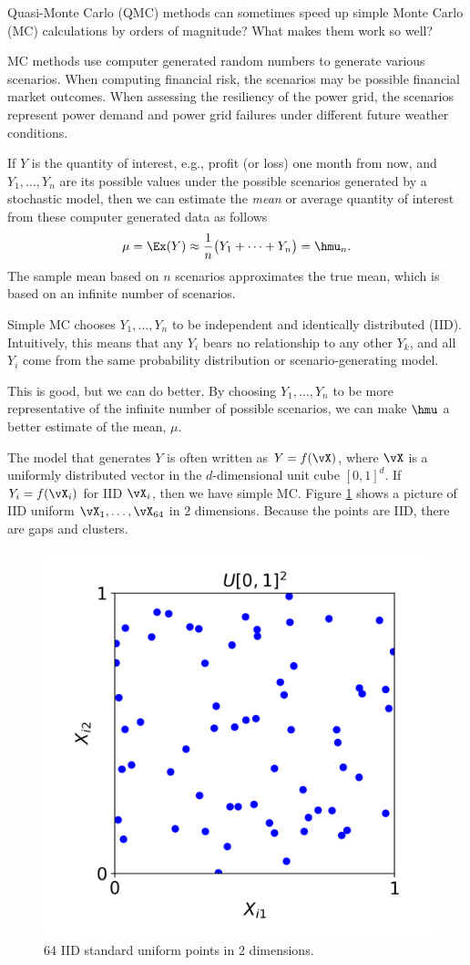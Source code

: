 Quasi-Monte Carlo (QMC) methods can sometimes speed up simple Monte Carlo (MC) calculations by orders of magnitude?  What makes them work so well?

MC methods use computer generated random numbers to generate various scenarios.  When computing financial risk, the scenarios may be possible financial market outcomes.  When assessing the resiliency of the power grid, the scenarios represent power demand and power grid failures under different future weather conditions.

If $Y$ is the quantity of interest, e.g., profit (or loss) one month from now, and $Y_1, \ldots, Y_n$ are its possible values under the possible scenarios generated by a stochastic model, then we can estimate the \emph{mean} or average quantity of interest from these computer generated data as follows
\[
\mu = \Ex(Y) \approx \frac 1n \bigl ( Y_1 + \cdots + Y_n \bigr) = \hmu_n.
\]
The sample mean based on $n$ scenarios approximates the true mean, which is based on an infinite number of scenarios.

Simple MC chooses $Y_1, \ldots, Y_n$ to be independent and identically distributed (IID).  Intuitively, this means that any $Y_i$ bears no relationship to any other $Y_k$, and all $Y_i$ come from the same probability distribution or scenario-generating model.

This is good, but we can do better.  By choosing $Y_1, \ldots, Y_n$ to be more representative of the infinite number of possible scenarios, we can make $\hmu$ a better estimate of the mean, $\mu$.

The model that generates $Y$ is often written as $Y= f(\vX)$, where $\vX$ is a uniformly distributed vector in the $d$-dimensional unit cube $[0,1]^d$.  If $Y_i = f(\vX_i)$ for IID $\vX_i$, then we have simple MC.  Figure \ref{fig:iid_pts} shows a picture of IID uniform  $\vX_1, \ldots, \vX_{64}$ in $2$ dimensions.  Because the points are IID, there are gaps and clusters.

\begin{figure}[H]
    \centering
    \includegraphics[width=.6\textwidth]{WhyQ/iid_uniform_pts.png}
    \caption{64 IID standard uniform points in 2 dimensions.}
    \label{fig:iid_pts}
\end{figure}

